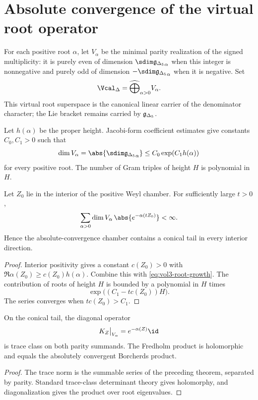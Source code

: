 \chapter{Absolute convergence of the virtual root operator}
For each positive root $\alpha$, let $V_\alpha$ be the minimal parity realization of the signed multiplicity: it is purely even of dimension $\sdim\gIg_\alpha$ when this integer is nonnegative and purely odd of dimension $-\sdim\gIg_\alpha$ when it is negative.  Set
\[
 \Vcal_\Delta=\widehat\bigoplus_{\alpha>0}V_\alpha.
\]
This virtual root superspace is the canonical linear carrier of the denominator character; the Lie bracket remains carried by ${\mathfrak g_{\Delta_5}}$.

Let $h(\alpha)$ be the proper height.  Jacobi-form coefficient estimates give constants $C_0,C_1>0$ such that
\begin{equation}\label{eq:vol3-root-growth}
 \dim V_\alpha=\abs{\sdim\gIg_\alpha}\le C_0\exp(C_1h(\alpha))
\end{equation}
for every positive root.  The number of Gram triples of height $H$ is polynomial in $H$.

\begin{theorem}
Let $Z_0$ lie in the interior of the positive Weyl chamber.  For sufficiently large $t>0$,
\[
 \sum_{\alpha>0}\dim V_\alpha\,
 \abs{e^{-\alpha(tZ_0)}}<\infty.
\]
Hence the absolute-convergence chamber contains a conical tail in every interior direction.
\end{theorem}
\begin{proof}
Interior positivity gives a constant $c(Z_0)>0$ with
$\Re\alpha(Z_0)\ge c(Z_0)h(\alpha)$.
Combine this with \eqref{eq:vol3-root-growth}.  The contribution of roots of height $H$ is bounded by a polynomial in $H$ times
\[
 \exp\bigl((C_1-tc(Z_0))H\bigr).
\]
The series converges when $tc(Z_0)>C_1$.
\end{proof}

\begin{corollary}
On the conical tail, the diagonal operator
\[
 K_Z\big|_{V_\alpha}=e^{-\alpha(Z)}\id
\]
is trace class on both parity summands.  The Fredholm product is holomorphic and equals the absolutely convergent Borcherds product.
\end{corollary}
\begin{proof}
The trace norm is the summable series of the preceding theorem, separated by parity.  Standard trace-class determinant theory gives holomorphy, and diagonalization gives the product over root eigenvalues.
\end{proof}


